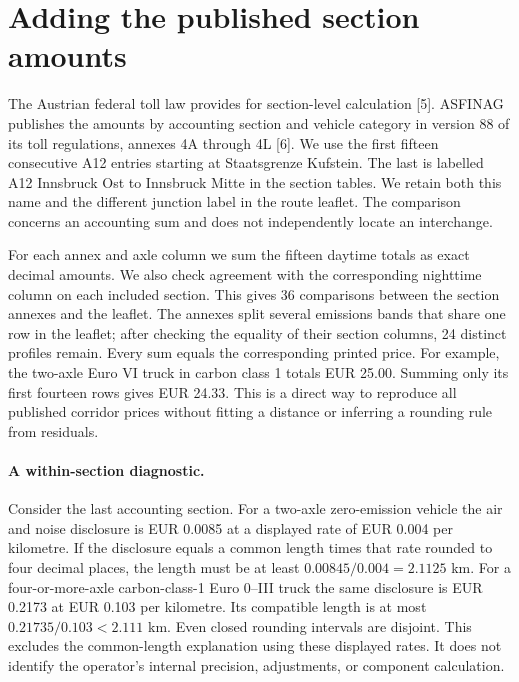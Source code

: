 \documentclass[11pt]{article}
\begin{document}
\section{Adding the published section amounts}
The Austrian federal toll law provides for section-level calculation [5]. ASFINAG publishes the amounts by accounting section and vehicle category in version 88 of its toll regulations, annexes 4A through 4L [6]. We use the first fifteen consecutive A12 entries starting at Staatsgrenze Kufstein. The last is labelled A12 Innsbruck Ost to Innsbruck Mitte in the section tables. We retain both this name and the different junction label in the route leaflet. The comparison concerns an accounting sum and does not independently locate an interchange.

For each annex and axle column we sum the fifteen daytime totals as exact decimal amounts. We also check agreement with the corresponding nighttime column on each included section. This gives 36 comparisons between the section annexes and the leaflet. The annexes split several emissions bands that share one row in the leaflet; after checking the equality of their section columns, 24 distinct profiles remain. Every sum equals the corresponding printed price. For example, the two-axle Euro VI truck in carbon class 1 totals EUR 25.00. Summing only its first fourteen rows gives EUR 24.33. This is a direct way to reproduce all published corridor prices without fitting a distance or inferring a rounding rule from residuals.

\paragraph{A within-section diagnostic.}
Consider the last accounting section. For a two-axle zero-emission vehicle the air and noise disclosure is EUR 0.0085 at a displayed rate of EUR 0.004 per kilometre. If the disclosure equals a common length times that rate rounded to four decimal places, the length must be at least $0.00845/0.004=2.1125$ km. For a four-or-more-axle carbon-class-1 Euro 0--III truck the same disclosure is EUR 0.2173 at EUR 0.103 per kilometre. Its compatible length is at most $0.21735/0.103<2.111$ km. Even closed rounding intervals are disjoint. This excludes the common-length explanation using these displayed rates. It does not identify the operator's internal precision, adjustments, or component calculation.
\end{document}
